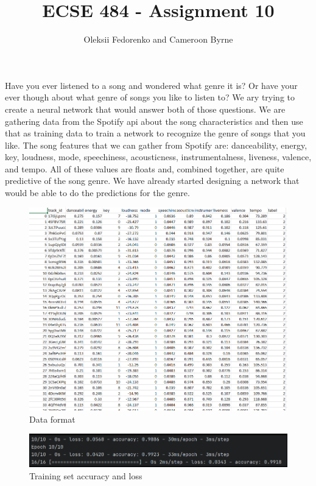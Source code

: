 \documentclass[12pt, oneside, a4paper]{article}
\begin{document}
 
    \title{\textbf{ECSE 484 - Assignment 10}}
    \author{Oleksii Fedorenko and Cameroon Byrne}
    \maketitle
    
    Have you ever listened to a song and wondered what genre it is? Or have your ever though about what genre of songs you like to listen to? We ary trying to create a neural network that would answer both of those questions. We are gathering data from the Spotify api about the song characteristics and then use that as training data to train a network to recognize the genre of songs that you like. The song features that we can gather from Spotify are: danceability, energy, key, loudness, mode, speechiness, acousticness, instrumentalness, liveness, valence, and tempo. All of these values are floats and, combined together, are quite predictive of the song genre. We have already started designing a network that would be able to do the predictions for the genre.  
    
    \FloatBarrier   
    \begin{figure}[H]
        \caption{Data format} 
        \centerline{
        \includegraphics[width=\textwidth]{data.PNG}
        } 
    \end{figure}

    \FloatBarrier 
    \begin{figure}[H]
        \caption{Training set accuracy and loss} 
        \centerline{
        \includegraphics[width=\textwidth]{tarining_set_loss_acc.PNG}
        } 
    \end{figure}
    
\end{document}
